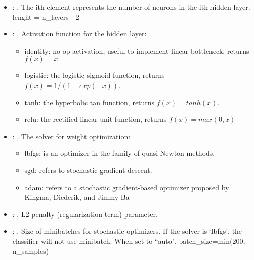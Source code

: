 \begin{itemize}
    \item {}: , 
      The ith element represents the number of neurons in the ith hidden layer.
      lenght = n\_layers - 2

    \item {}: , 
      Activation function for the hidden layer:
      \begin{itemize}                                                    \item identity:  no-op
      activation, useful to implement linear bottleneck, returns $f(x) = x$
      \item logistic: the logistic sigmoid function, returns $f(x) = 1 / (1 + exp(-x))$.
      \item tanh: the hyperbolic tan function, returns $f(x) = tanh(x)$.
      \item relu:  the rectified linear unit function, returns $f(x) = max(0, x)$
      \end{itemize}

    \item {}: , 
      The solver for weight optimization:
      \begin{itemize}                                                    \item lbfgs: is an
      optimizer in the family of quasi-Newton methods.
      \item sgd: refers to stochastic gradient descent.
      \item adam: refers to a stochastic gradient-based optimizer proposed by Kingma, Diederik, and
      Jimmy Ba                                                  \end{itemize}

    \item {}: , 
      L2 penalty (regularization term) parameter.

    \item {}: , 
      Size of minibatches for stochastic optimizers. If the solver is `lbfgs',
      the classifier will not use minibatch. When set to ``auto", batch\_size=min(200, n\_samples)


\end{itemize}

